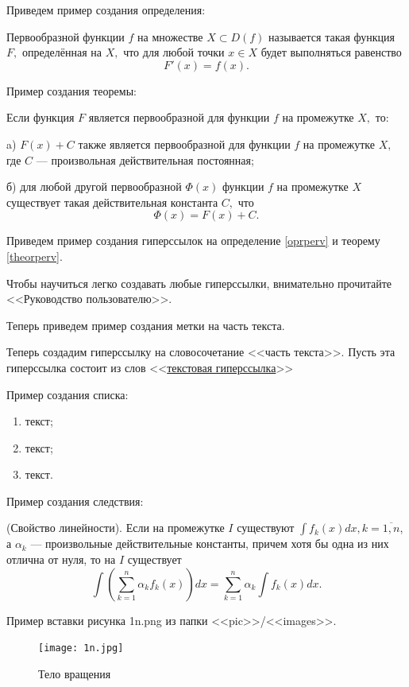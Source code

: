Приведем пример создания определения:

\begin{opr}\label{oprperv} \rm Первообразной функции $f$ на множестве $X{\subset}D(f)$
называется такая функция $F,$ определённая на $X,$ что для любой
точки $x\in{X}$ будет выполняться равенство
  $$F'(x)=f(x).$$
\end{opr}

Пример создания теоремы:
\begin{theorem}\label{theorperv} Если функция $F$ является первообразной для функции $f$
на промежутке $X,$ то:

   {\rm a)} $F(x)+C$ также является первообразной для функции $f$ на промежутке
$X,$ где $C$ --- произвольная действительная постоянная;

    {\rm б)} для любой
другой первообразной $\Phi(x)$ функции $f$ на промежутке $X$
существует такая действительная константа $C,$ что
  $$\Phi(x)=F(x)+C.$$
\end{theorem}

Приведем пример создания гиперссылок на определение \ref{oprperv}  и теорему \ref{theorperv}.

Чтобы научиться легко создавать любые гиперссылки, внимательно прочитайте <<Руководство
пользователю>>.

Теперь приведем пример создания метки {\color{green}\hypertarget{metkatext}{на часть текста}}.

Теперь создадим гиперссылку на словосочетание <<часть текста>>. Пусть эта гиперссылка
состоит из слов <<\hyperlink{metkatext}{текстовая гиперссылка}>>

Пример создания списка:
\begin{enumerate}
\item текст;
\item текст;
\item текст.
\end{enumerate}

Пример создания следствия:
\begin{corollary}{\rm(Свойство линейности)}. Если на промежутке $I$ существуют $\int
f_k(x)dx, k=\overline{1,n}$, а $\alpha_k$ --- произвольные
действительные константы, причем хотя бы одна из них отлична от
нуля, то на $I$ существует $$\int\left(\sum_{k=1}^n \alpha_k
f_k(x)\right)dx=\sum_{k=1}^n \alpha_k
\int{f_k(x)dx}.$$\end{corollary}

Пример вставки рисунка 1n.png из папки <<pic>>/<<images>>.
\begin{figure}[h!]\center
  \texttt{[image: 1n.jpg]}
   \caption{Тело вращения}\label{ris1}
\end{figure}

